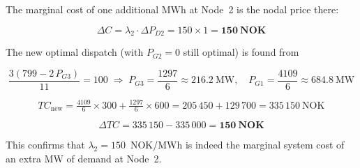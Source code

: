 The marginal cost of one additional MWh at Node~2 is the nodal price there:

\[
  \Delta C = \lambda_2 \cdot \Delta P_{D2} = 150 \times 1 = \mathbf{150~\text{NOK}}
\]

The new optimal dispatch (with $P_{G2} = 0$ still optimal) is found from

\[
  \frac{3(799 - 2\,P_{G3})}{11} = 100
  \;\Rightarrow\; P_{G3} = \frac{1297}{6} \approx 216.2~\text{MW},\quad
  P_{G1} = \frac{4109}{6} \approx 684.8~\text{MW}
\]

\[
  TC_{\text{new}}
    = \tfrac{4109}{6}\times300 + \tfrac{1297}{6}\times600
    = 205\,450 + 129\,700
    = 335\,150~\text{NOK}
\]

\[
  \Delta TC = 335\,150 - 335\,000 = \mathbf{150~\text{NOK}}
\]

This confirms that $\lambda_2 = 150$~NOK/MWh is indeed the marginal system
cost of an extra MW of demand at Node~2.
